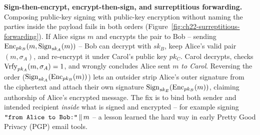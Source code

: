 \begin{trapbox}
\textbf{Sign-then-encrypt, encrypt-then-sign, and surreptitious forwarding.} Composing public-key signing with public-key encryption without naming the parties inside the payload fails in both orders (Figure~\ref{fig:ch22-surreptitious-forwarding}). If Alice signs $m$ and encrypts the pair to Bob -- sending $\operatorname{Enc}_{pk_B}(m, \operatorname{Sign}_{sk_A}(m))$ -- Bob can decrypt with $sk_B$, keep Alice's valid pair $(m, \sigma_A)$, and re-encrypt it under Carol's public key $pk_C$. Carol decrypts, checks $\operatorname{Vrfy}_{pk_A}(m, \sigma_A) = 1$, and wrongly concludes Alice sent $m$ \emph{to Carol}. Reversing the order ($\operatorname{Sign}_{sk_A}(\operatorname{Enc}_{pk_B}(m))$) lets an outsider strip Alice's outer signature from the ciphertext and attach their own signature $\operatorname{Sign}_{sk_E}(\operatorname{Enc}_{pk_B}(m))$, claiming authorship of Alice's encrypted message. The fix is to bind both sender and intended recipient \emph{inside} what is signed and encrypted -- for example signing $\texttt{"from Alice to Bob:"} \,\|\, m$ -- a lesson learned the hard way in early Pretty Good Privacy (PGP) email tools.
\end{trapbox}

